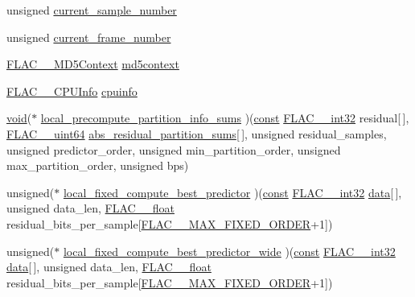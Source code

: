 \begin{DoxyCompactItemize}
\item 
unsigned \hyperlink{struct_f_l_a_c_____stream_encoder_private_ae5fc015d13361e8a239cbed4096274eb}{current\+\_\+sample\+\_\+number}
\item 
unsigned \hyperlink{struct_f_l_a_c_____stream_encoder_private_a3eea3d6f42bc6bbe4e841b8e159adb5b}{current\+\_\+frame\+\_\+number}
\item 
\hyperlink{struct_f_l_a_c_____m_d5_context}{F\+L\+A\+C\+\_\+\+\_\+\+M\+D5\+Context} \hyperlink{struct_f_l_a_c_____stream_encoder_private_a51b589c4479a224c6295a469b84e0e16}{md5context}
\item 
\hyperlink{struct_f_l_a_c_____c_p_u_info}{F\+L\+A\+C\+\_\+\+\_\+\+C\+P\+U\+Info} \hyperlink{struct_f_l_a_c_____stream_encoder_private_a7b943d5d0fe6204f16db8d875d651302}{cpuinfo}
\item 
\hyperlink{sound_8c_ae35f5844602719cf66324f4de2a658b3}{void}($\ast$ \hyperlink{struct_f_l_a_c_____stream_encoder_private_adf035e322004872a812fbf48f3ad6ef7}{local\+\_\+precompute\+\_\+partition\+\_\+info\+\_\+sums} )(\hyperlink{getopt1_8c_a2c212835823e3c54a8ab6d95c652660e}{const} \hyperlink{ordinals_8h_a33fd77bfe6d685541a0c034a75deccdc}{F\+L\+A\+C\+\_\+\+\_\+int32} residual\mbox{[}$\,$\mbox{]}, \hyperlink{ordinals_8h_aa78c8c70a3eb8a58af7436f278acde8e}{F\+L\+A\+C\+\_\+\+\_\+uint64} \hyperlink{struct_f_l_a_c_____stream_encoder_private_aa63dec17dc75910b274ab8467768f8c6}{abs\+\_\+residual\+\_\+partition\+\_\+sums}\mbox{[}$\,$\mbox{]}, unsigned residual\+\_\+samples, unsigned predictor\+\_\+order, unsigned min\+\_\+partition\+\_\+order, unsigned max\+\_\+partition\+\_\+order, unsigned bps)
\item 
unsigned($\ast$ \hyperlink{struct_f_l_a_c_____stream_encoder_private_a19c1e35e1f5c261b9721d5b6286b6479}{local\+\_\+fixed\+\_\+compute\+\_\+best\+\_\+predictor} )(\hyperlink{getopt1_8c_a2c212835823e3c54a8ab6d95c652660e}{const} \hyperlink{ordinals_8h_a33fd77bfe6d685541a0c034a75deccdc}{F\+L\+A\+C\+\_\+\+\_\+int32} \hyperlink{lib_2expat_8h_ac39e72a1de1cb50dbdc54b08d0432a24}{data}\mbox{[}$\,$\mbox{]}, unsigned data\+\_\+len, \hyperlink{float_8h_aa081c47b0e3ecaf406a6cf718768a69c}{F\+L\+A\+C\+\_\+\+\_\+float} residual\+\_\+bits\+\_\+per\+\_\+sample\mbox{[}\hyperlink{group__flac__format_gabd0d5d6fe71b337244712b244ae7cb0f}{F\+L\+A\+C\+\_\+\+\_\+\+M\+A\+X\+\_\+\+F\+I\+X\+E\+D\+\_\+\+O\+R\+D\+ER}+1\mbox{]})
\item 
unsigned($\ast$ \hyperlink{struct_f_l_a_c_____stream_encoder_private_a30a7f0bfe073e48c3112e6ed6e8998a3}{local\+\_\+fixed\+\_\+compute\+\_\+best\+\_\+predictor\+\_\+wide} )(\hyperlink{getopt1_8c_a2c212835823e3c54a8ab6d95c652660e}{const} \hyperlink{ordinals_8h_a33fd77bfe6d685541a0c034a75deccdc}{F\+L\+A\+C\+\_\+\+\_\+int32} \hyperlink{lib_2expat_8h_ac39e72a1de1cb50dbdc54b08d0432a24}{data}\mbox{[}$\,$\mbox{]}, unsigned data\+\_\+len, \hyperlink{float_8h_aa081c47b0e3ecaf406a6cf718768a69c}{F\+L\+A\+C\+\_\+\+\_\+float} residual\+\_\+bits\+\_\+per\+\_\+sample\mbox{[}\hyperlink{group__flac__format_gabd0d5d6fe71b337244712b244ae7cb0f}{F\+L\+A\+C\+\_\+\+\_\+\+M\+A\+X\+\_\+\+F\+I\+X\+E\+D\+\_\+\+O\+R\+D\+ER}+1\mbox{]})

\end{DoxyCompactItemize}
